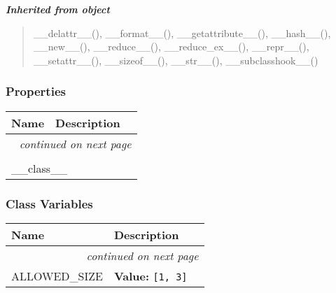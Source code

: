\large{\textbf{\textit{Inherited from object}}}

\begin{quote}
\_\_delattr\_\_(), \_\_format\_\_(), \_\_getattribute\_\_(), \_\_hash\_\_(), \_\_new\_\_(), \_\_reduce\_\_(), \_\_reduce\_ex\_\_(), \_\_repr\_\_(), \_\_setattr\_\_(), \_\_sizeof\_\_(), \_\_str\_\_(), \_\_subclasshook\_\_()
\end{quote}


  \subsubsection{Properties}

    \vspace{-1cm}
\hspace{\varindent}\begin{longtable}{|p{\varnamewidth}|p{\vardescrwidth}|l}
\cline{1-2}
\cline{1-2} \centering \textbf{Name} & \centering \textbf{Description}& \\
\cline{1-2}
\endhead\cline{1-2}\multicolumn{3}{r}{\small\textit{continued on next page}}\\\endfoot\cline{1-2}
\endlastfoot\multicolumn{2}{|l|}{\textit{Inherited from object}}\\
\multicolumn{2}{|p{\varwidth}|}{\raggedright \_\_class\_\_}\\
\cline{1-2}
\end{longtable}



  \subsubsection{Class Variables}

    \vspace{-1cm}
\hspace{\varindent}\begin{longtable}{|p{\varnamewidth}|p{\vardescrwidth}|l}
\cline{1-2}
\cline{1-2} \centering \textbf{Name} & \centering \textbf{Description}& \\
\cline{1-2}
\endhead\cline{1-2}\multicolumn{3}{r}{\small\textit{continued on next page}}\\\endfoot\cline{1-2}
\endlastfoot\raggedright A\-L\-L\-O\-W\-E\-D\-\_\-S\-I\-Z\-E\- & \raggedright \textbf{Value:} 
{\tt [1, 3]}&\\
\cline{1-2}
\end{longtable}

